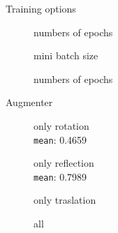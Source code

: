 \documentclass[aspectratio=169,xcolor=dvipsnames]{beamer}
\begin{document}
\begin{frame}{Training options}
\begin{figure}
	\centering
	\begin{minipage}{0.3\linewidth}
		\centering
		\footnotesize{numbers of epochs}\\\vspace{2 mm}
		\fontsize{3}{4}\vspace{1 mm}
			\fontsize{3}{4}
	\end{minipage}
	\begin{minipage}{0.3\linewidth}
	\centering
	\footnotesize{mini batch size}\\\vspace{2 mm}
	\fontsize{3}{4}\vspace{1 mm}
	\fontsize{3}{4}
\end{minipage}
	\begin{minipage}{0.3\linewidth}
	\centering
	\footnotesize{numbers of epochs}\\\vspace{2 mm}
	\fontsize{3}{4}\vspace{1 mm}
	\fontsize{3}{4}
\end{minipage}
\end{figure}	
\end{frame}

\begin{frame}{Augmenter}
	\begin{figure}
		\centering
		\begin{minipage}{0.5\linewidth}
			\centering
		\tiny{only rotation\\ \texttt{mean}: 0.4659}
		\end{minipage}\hfill
		\begin{minipage}{0.5\linewidth}
			\centering
			\tiny{only reflection\\ \texttt{mean}: 0.7989}
		\end{minipage}\hfill
		\begin{minipage}{0.5\linewidth}
			\vspace{5 mm}
			\centering
			\tiny{only traslation}
				\fontsize{3}{4}
		\end{minipage}\hfill
		\begin{minipage}{0.5\linewidth}
		\centering
		\vspace{5 mm}
		\tiny{all}\\
		\fontsize{3}{4}
	\end{minipage}
	\end{figure}	
\end{frame}
\end{document}
